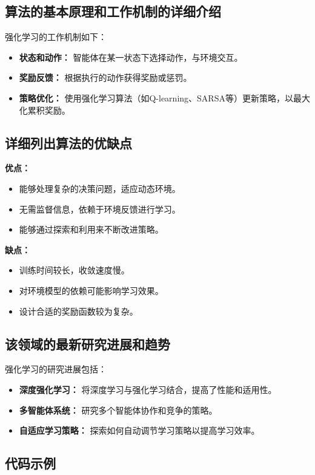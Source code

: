 \subsection*{算法的基本原理和工作机制的详细介绍}
强化学习的工作机制如下：
\begin{itemize}
    \item \textbf{状态和动作：} 智能体在某一状态下选择动作，与环境交互。
    \item \textbf{奖励反馈：} 根据执行的动作获得奖励或惩罚。
    \item \textbf{策略优化：} 使用强化学习算法（如Q-learning、SARSA等）更新策略，以最大化累积奖励。
\end{itemize}

\subsection*{详细列出算法的优缺点}
\textbf{优点：}
\begin{itemize}
    \item 能够处理复杂的决策问题，适应动态环境。
    \item 无需监督信息，依赖于环境反馈进行学习。
    \item 能够通过探索和利用来不断改进策略。
\end{itemize}

\textbf{缺点：}
\begin{itemize}
    \item 训练时间较长，收敛速度慢。
    \item 对环境模型的依赖可能影响学习效果。
    \item 设计合适的奖励函数较为复杂。
\end{itemize}

\subsection*{该领域的最新研究进展和趋势}
强化学习的研究进展包括：
\begin{itemize}
    \item \textbf{深度强化学习：} 将深度学习与强化学习结合，提高了性能和适用性。
    \item \textbf{多智能体系统：} 研究多个智能体协作和竞争的策略。
    \item \textbf{自适应学习策略：} 探索如何自动调节学习策略以提高学习效率。
\end{itemize}
\subsection*{代码示例}
\begin{lstlisting}

\end{lstlisting}


